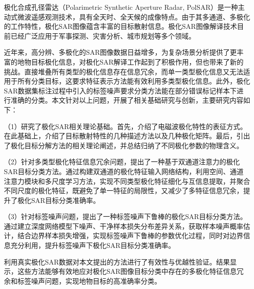 \begin{chineseabstract}

  极化合成孔径雷达（Polarimetric Synthetic Aperture Radar, PolSAR）是一种主动式微波遥感观测技术，具有全天时、全天候的成像特点。由于其多通道、多极化的工作特性，极化SAR图像蕴含丰富的目标散射信息。极化SAR图像解译技术目前已经广泛应用于军事探测、灾害分析、城市规划等多个领域。

  近年来，高分辨、多极化的SAR图像数据日益增多，为复杂场景分析提供了更丰富的地物目标极化信息，对极化SAR解译工作起到了积极作用，但也带来了新的挑战。直接堆叠所有类型的极化信息存在信息冗余，而单一类型极化信息又无法适用于所有分类目标，这要求特征表示方法能有效利用多类型极化信息。此外，极化SAR数据集标注过程中引入的标签噪声要求分类方法能在部分错误标记样本下进行准确的分类。本文针对以上问题，开展了相关基础研究与创新，主要研究内容如下：

  （1）研究了极化SAR相关理论基础。首先，介绍了电磁波极化特性的表征方式。在此基础上，介绍了目标散射特性的几种描述方法以及几种极化矩阵。最后，引出了极化目标分解方法的相关理论阐述，并总结归纳了不同极化参数的物理含义。

  （2）针对多类型极化特征信息冗余问题，提出了一种基于双通道注意力的极化SAR目标分类方法。通过构建双通道的极化特征输入网络结构，利用空间、通道注意力模块和多尺度学习方法，实现不同类型极化特征细化与互信息提取，并聚合不同尺度的极化特征，既避免了单一特征的局限性，又减少了多特征信息冗余，提升了极化SAR目标分类准确率。

  （3）针对标签噪声问题，提出了一种标签噪声下鲁棒的极化SAR目标分类方法。通过建立深度网络模型下噪声、干净样本损失分布差异关系，获取样本噪声概率估计，结合边界样本损失增强，实现标签噪声下鲁棒的参数优化过程，同时对边界信息充分利用，提升标签噪声下极化SAR目标分类准确率。

  利用真实极化SAR数据对本文提出的方法进行了有效性与优越性验证。结果显示，这些方法能够有效地应对极化SAR图像目标分类中存在的多极化特征信息冗余和标签噪声问题，实现地物目标的高准确率分类。


\end{chineseabstract}